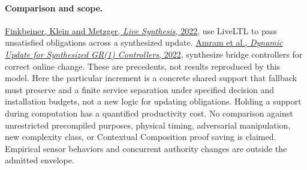 \documentclass[11pt]{article}
\begin{document}
\paragraph{Comparison and scope.}
\href{https://doi.org/10.1007/s11334-022-00447-5}{Finkbeiner, Klein and Metzger, \emph{Live Synthesis}, 2022}, use LiveLTL to pass unsatisfied obligations across a synthesized update. \href{https://pldb.kirancodes.me/p/conf/icse/AmramBSY22}{Amram et al., \emph{Dynamic Update for Synthesized GR(1) Controllers}, 2022}, synthesize bridge controllers for correct online change. These are precedents, not results reproduced by this model. Here the particular increment is a concrete shared support that fallback must preserve and a finite service separation under specified decision and installation budgets, not a new logic for updating obligations. Holding a support during computation has a quantified productivity cost. No comparison against unrestricted precompiled purposes, physical timing, adversarial manipulation, new complexity class, or Contextual Composition proof saving is claimed. Empirical sensor behaviors and concurrent authority changes are outside the admitted envelope.
\end{document}
